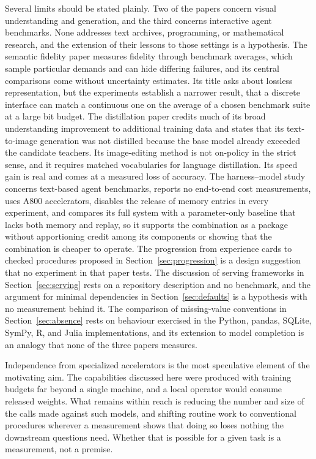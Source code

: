 \documentclass[11pt]{article}
\theoremstyle{remark}
\begin{document}
Several limits should be stated plainly. Two of the papers concern visual understanding and generation, and the third concerns interactive agent benchmarks. None addresses text archives, programming, or mathematical research, and the extension of their lessons to those settings is a hypothesis. The semantic fidelity paper measures fidelity through benchmark averages, which sample particular demands and can hide differing failures, and its central comparisons come without uncertainty estimates. Its title asks about lossless representation, but the experiments establish a narrower result, that a discrete interface can match a continuous one on the average of a chosen benchmark suite at a large bit budget. The distillation paper credits much of its broad understanding improvement to additional training data and states that its text-to-image generation was not distilled because the base model already exceeded the candidate teachers. Its image-editing method is not on-policy in the strict sense, and it requires matched vocabularies for language distillation. Its speed gain is real and comes at a measured loss of accuracy. The harness--model study concerns text-based agent benchmarks, reports no end-to-end cost measurements, uses A800 accelerators, disables the release of memory entries in every experiment, and compares its full system with a parameter-only baseline that lacks both memory and replay, so it supports the combination as a package without apportioning credit among its components or showing that the combination is cheaper to operate. The progression from experience cards to checked procedures proposed in Section~\ref{sec:progression} is a design suggestion that no experiment in that paper tests. The discussion of serving frameworks in Section~\ref{sec:serving} rests on a repository description and no benchmark, and the argument for minimal dependencies in Section~\ref{sec:defaults} is a hypothesis with no measurement behind it. The comparison of missing-value conventions in Section~\ref{sec:absence} rests on behaviour exercised in the Python, pandas, SQLite, SymPy, R, and Julia implementations, and its extension to model completion is an analogy that none of the three papers measures.

Independence from specialized accelerators is the most speculative element of the motivating aim. The capabilities discussed here were produced with training budgets far beyond a single machine, and a local operator would consume released weights. What remains within reach is reducing the number and size of the calls made against such models, and shifting routine work to conventional procedures wherever a measurement shows that doing so loses nothing the downstream questions need. Whether that is possible for a given task is a measurement, not a premise.
\end{document}
